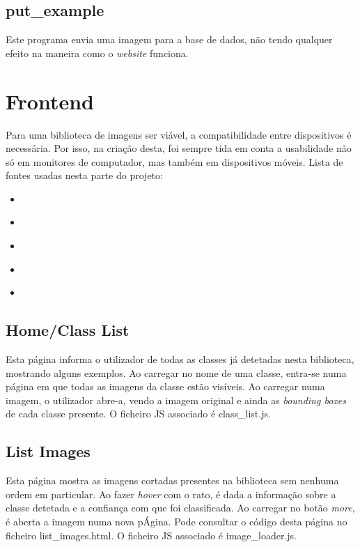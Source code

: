 \documentclass{report}
\begin{document}
\subsection{put\_example}
Este programa envia uma imagem para a base de dados, não tendo qualquer efeito na maneira como o \textit{website} funciona.

\section{Frontend}
Para uma biblioteca de imagens ser viável, a compatibilidade entre dispositivos é necessária. Por isso, na criação desta, foi sempre tida em conta a usabilidade não só em monitores de computador, mas também em dispositivos móveis. 
Lista de fontes usadas nesta parte do projeto:
\begin{itemize}
\item \cite[\textit{W3 Schools}]{W3}
\item \cite[\textit{StackOverflow}]{SOvf}
\item \cite[\textit{Documentação de JavaScript}]{JS}
\item \cite[\textit{Primeira fonte de imagens}]{Im1}
\item \cite[\textit{Segunda fonte de imagens}]{Im2}
\end{itemize}

\subsection{Home/Class List}
Esta página informa o utilizador de todas as classes já detetadas nesta biblioteca, mostrando alguns exemplos. Ao carregar no nome de uma classe, entra-se numa página em que todas as imagens da classe estão visíveis. Ao carregar numa imagem, o utilizador abre-a, vendo a imagem original e ainda as \textit{bounding boxes} de cada classe presente. O ficheiro \ac{JS} associado é class\_list.js.

\subsection{List Images}
Esta página mostra as imagens cortadas presentes na biblioteca sem nenhuma ordem em particular. Ao fazer \textit{hover} com o rato, é dada a informação sobre a classe detetada e a confiança com que foi classificada. Ao carregar no botão \textit{more}, é aberta a imagem numa nova pÁgina. Pode consultar o código desta página no ficheiro list\_images.html. O ficheiro \ac{JS} associado é image\_loader.js.
\end{document}
